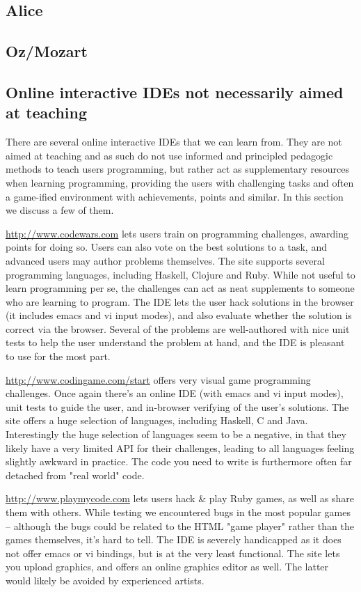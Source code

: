 \subsection{Alice}

\subsection{Oz/Mozart}

\subsection{Online interactive IDEs not necessarily aimed at teaching}
There are several online interactive IDEs that we can learn from. They are not 
aimed at teaching and as such do not use informed and principled pedagogic 
methods to teach users programming, but rather act as supplementary resources 
when learning programming, providing the users with challenging tasks and 
often a game-ified environment with achievements, points and similar. In this 
section we discuss a few of them.

\url{http://www.codewars.com} lets users train on programming challenges, 
awarding points for doing so. Users can also vote on the best solutions to a 
task, and advanced users may author problems themselves. The site supports 
several programming languages, including Haskell, Clojure and Ruby. While not 
useful to learn programming per se, the challenges can act as neat supplements 
to someone who are learning to program. The IDE lets the user hack solutions 
in the browser (it includes emacs and vi input modes), and also evaluate 
whether the solution is correct via the browser. Several of the problems are 
well-authored with nice unit tests to help the user understand the problem at 
hand, and the IDE is pleasant to use for the most part.

\url{http://www.codingame.com/start} offers very visual game programming 
challenges. Once again there's an online IDE (with emacs and vi input modes), 
unit tests to guide the user, and in-browser verifying of the user's 
solutions. The site offers a huge selection of languages, including Haskell, C 
and Java. Interestingly the huge selection of languages seem to be a negative, 
in that they likely have a very limited API for their challenges, leading to 
all languages feeling slightly awkward in practice. The code you need to write 
is furthermore often far detached from "real world" code.

\url{http://www.playmycode.com} lets users hack \& play Ruby games, as well as 
share them with others. While testing we encountered bugs in the most popular 
games -- although the bugs could be related to the HTML "game player" rather 
than the games themselves, it's hard to tell. The IDE is severely handicapped 
as it does not offer emacs or vi bindings, but is at the very least 
functional. The site lets you upload graphics, and offers an online graphics 
editor as well. The latter would likely be avoided by experienced artists.
